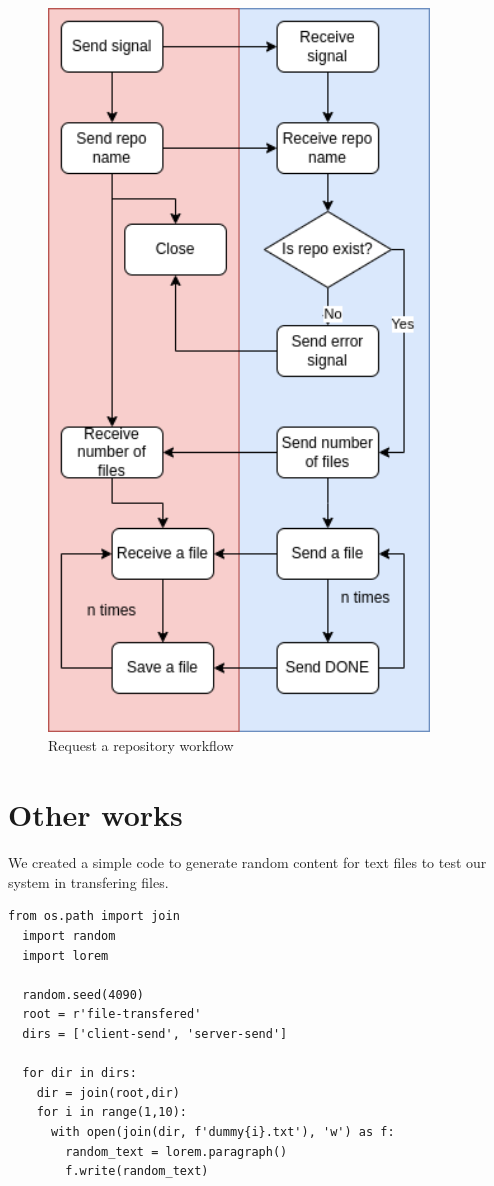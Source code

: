 \documentclass{article}
\begin{document}
\begin{figure}[H]
\begin{minipage}{0.45\textwidth}
      \includegraphics[width=0.9\textwidth]{REQUEST_A_REPO.drawio.png} %
      \caption{Request a repository workflow}
  \end{minipage}
\end{figure}
\pagebreak
\section*{Other works}
We created a simple code to generate random content for text files to test our system in transfering files.

\begin{lstlisting}[frame=single]
  from os.path import join
  import random
  import lorem

  random.seed(4090)
  root = r'file-transfered'
  dirs = ['client-send', 'server-send']

  for dir in dirs:
    dir = join(root,dir)
    for i in range(1,10):
      with open(join(dir, f'dummy{i}.txt'), 'w') as f:
        random_text = lorem.paragraph()
        f.write(random_text)
\end{lstlisting}
\end{document}
